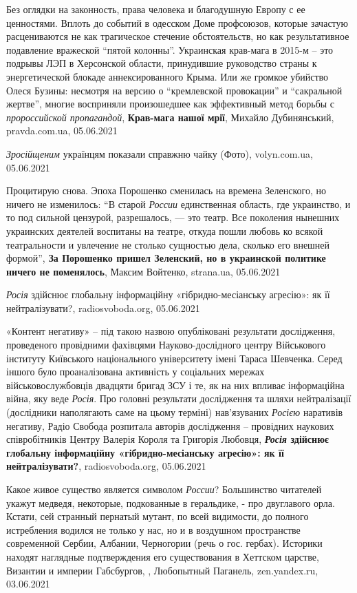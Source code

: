 Без оглядки на законность, права человека и благодушную Европу с ее ценностями.
Вплоть до событий в одесском Доме профсоюзов, которые зачастую расцениваются не
как трагическое стечение обстоятельств, но как результативное подавление
вражеской \enquote{пятой колонны}. Украинская крав-мага в 2015-м – это подрывы
ЛЭП в Херсонской области, принудившие руководство страны к энергетической
блокаде аннексированного Крыма.  Или же громкое убийство Олеся Бузины: несмотря
на версию о \enquote{кремлевской провокации} и \enquote{сакральной жертве},
многие восприняли произошедшее как эффективный метод борьбы с
\emph{пророссийской пропагандой},
\textbf{Крав-мага нашої мрії},
Михайло Дубинянський, pravda.com.ua, 05.06.2021

\emph{Зросійщеним} українцям показали справжню чайку (Фото), 
volyn.com.ua, 05.06.2021

Процитирую снова. Эпоха Порошенко сменилась на времена Зеленского, но ничего не
изменилось: \enquote{В старой \emph{России} единственная область, где
украинство, и то под сильной цензурой, разрешалось, — это театр. Все поколения
нынешних украинских деятелей воспитаны на театре, откуда пошли любовь ко всякой
театральности и увлечение не столько сущностью дела, сколько его внешней
формой}, 
\textbf{За Порошенко пришел Зеленский, но в украинской политике ничего не поменялось}, Максим Войтенко, strana.ua, 05.06.2021

\emph{Росія} здійснює глобальну інформаційну «гібридно-месіанську агресію»: як її нейтралізувати?,
radiosvoboda.org, 05.06.2021

«Контент негативу» – під такою назвою опубліковані результати дослідження,
проведеного провідними фахівцями Науково-дослідного центру Військового
інституту Київського національного університету імені Тараса Шевченка. Серед
іншого було проаналізована активність у соціальних мережах військовослужбовців
двадцяти бригад ЗСУ і те, як на них впливає інформаційна війна, яку веде
\emph{Росія}.  Про головні результати дослідження та шляхи нейтралізації
(дослідники наполягають саме на цьому терміні) нав'язуваних \emph{Росією}
наративів негативу, Радіо Свобода розпитала авторів дослідження – провідних
наукових співробітників Центру Валерія Короля та Григорія Любовця,
\textbf{\emph{Росія} здійснює глобальну інформаційну «гібридно-месіанську агресію»: як її нейтралізувати?},
radiosvoboda.org, 05.06.2021

Какое живое существо является символом \emph{России}? Большинство читателей укажут
медведя, некоторые, подкованные в геральдике, - про двуглавого орла. Кстати,
сей странный пернатый мутант, по всей видимости, до полного истребления водился
не только у нас, но и в воздушном пространстве современной Сербии, Албании,
Черногории (речь о гос. гербах). Историки находят наглядные подтверждения его
существования в Хеттском царстве, Византии и империи Габсбургов,
, Любопытный Паганель,
zen.yandex.ru, 03.06.2021

